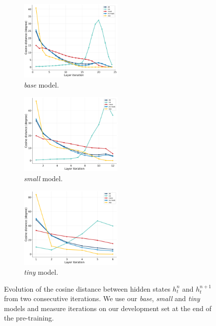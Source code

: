 \begin{figure}[htb!]
    \centering
    \begin{subfigure}[b]{0.32\textwidth}
        \centering
        \includegraphics[width=5cm]{images/cosine-base-v4.png}
        \caption{\textit{base} model.}
    \end{subfigure}
    \hfill
    \begin{subfigure}[b]{0.32\textwidth}  
        \centering 
        \includegraphics[width=5cm]{images/cosine-small-v4.png}
        \caption{\textit{small} model.}
    \end{subfigure}
    \hfill
    \begin{subfigure}[b]{0.32\textwidth}   
        \centering 
        \includegraphics[width=5cm]{images/cosine-tiny-v4.png}
        \caption{\textit{tiny} model.}
    \end{subfigure}
    \hfill
    \caption{Evolution of the cosine distance between hidden states $h^n_t$ and $h^{n+1}_t$ from two consecutive iterations. We use our \textit{base}, \textit{small} and \textit{tiny} models and measure iterations on our development set at the end of the pre-training.}
\end{figure}

